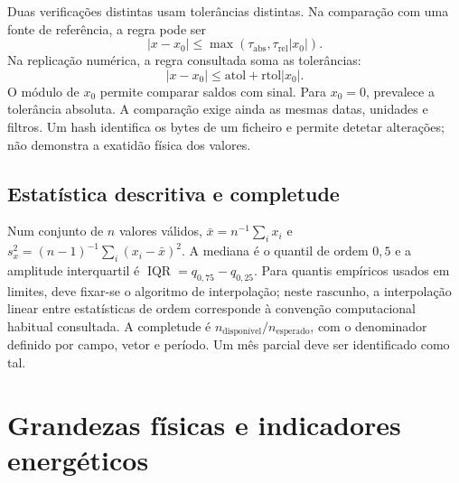 Duas verificações distintas usam tolerâncias distintas. Na comparação com uma fonte de referência, a regra pode ser
\begin{equation}
|x-x_0|\leq\max(\tau_{\mathrm{abs}},\tau_{\mathrm{rel}}|x_0|).
\label{eq:mat-tolerancia-dados}
\end{equation}
Na replicação numérica, a regra consultada soma as tolerâncias:
\begin{equation}
|x-x_0|\leq\mathrm{atol}+\mathrm{rtol}|x_0|.
\label{eq:mat-tolerancia-replica}
\end{equation}
O módulo de $x_0$ permite comparar saldos com sinal. Para $x_0=0$, prevalece a tolerância absoluta. A comparação exige ainda as mesmas datas, unidades e filtros. Um hash identifica os bytes de um ficheiro e permite detetar alterações; não demonstra a exatidão física dos valores.

\subsection{Estatística descritiva e completude}
\label{sec:mat-descritiva}
Num conjunto de $n$ valores válidos, $\bar x=n^{-1}\sum_i x_i$ e $s_x^2=(n-1)^{-1}\sum_i(x_i-\bar x)^2$. A mediana é o quantil de ordem $0{,}5$ e a amplitude interquartil é $\operatorname{IQR}=q_{0,75}-q_{0,25}$. Para quantis empíricos usados em limites, deve fixar-se o algoritmo de interpolação; neste rascunho, a interpolação linear entre estatísticas de ordem corresponde à convenção computacional habitual consultada. A completude é $n_{\mathrm{disponível}}/n_{\mathrm{esperado}}$, com o denominador definido por campo, vetor e período. Um mês parcial deve ser identificado como tal.


\section{Grandezas físicas e indicadores energéticos}
\label{sec:mat-energia}

